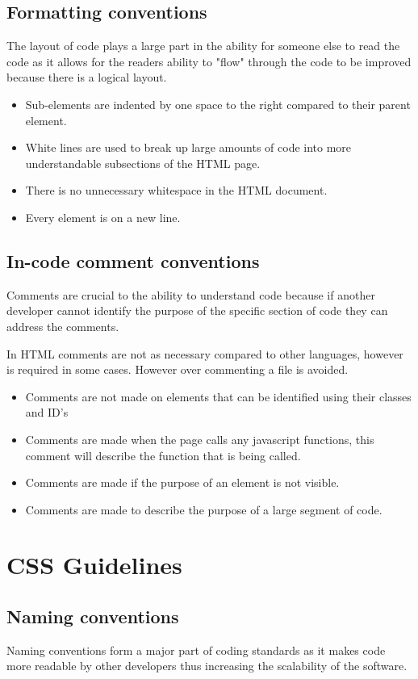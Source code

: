 \documentclass[11pt]{article}
\begin{document}
	\subsection{Formatting conventions}
	The layout of code plays a large part in the ability for someone else to read the code as it allows for the readers ability to "flow" through the code to be improved because there is a logical layout.
	\begin{itemize}
		\item Sub-elements are indented by one space to the right compared to their parent element.
		\item White lines are used to break up large amounts of code into more understandable subsections of the HTML page.
		\item There is no unnecessary whitespace in the HTML document.
		\item Every element is on a new line.
	\end{itemize}
	\subsection{In-code comment conventions}
	Comments are crucial to the ability to understand code because if another developer cannot identify the purpose of the specific section of code they can address the comments.
	
	In HTML comments are not as necessary compared to other languages, however is required in some cases. However over commenting a file is avoided.
	\begin{itemize}
		\item Comments are not made on elements that can be identified using their classes and ID's
		\item Comments are made when the page calls any javascript functions, this comment will describe the function that is being called.
		\item Comments are made if the purpose of an element is not visible.
		\item Comments are made to describe the purpose of a large segment of code.
	\end{itemize}

	\section{CSS Guidelines}
	\subsection{Naming conventions}
	Naming conventions form a major part of coding standards as it makes code more readable by other developers thus increasing the scalability of the software.
\end{document}
